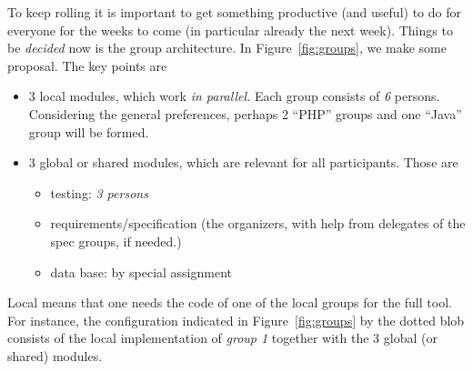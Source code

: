 \documentclass[11pt,handout]{handout}
\begin{document}
To keep rolling it is important to get something productive (and useful) to
do for everyone for the weeks to come (in particular already the next
week). Things to be \emph{decided} now is the group architecture. In
Figure~\ref{fig:groups}, we make some proposal. The key points are

\begin{itemize}
\item 3 local modules, which work \emph{in parallel.}  Each group consists
  of \emph{6} persons. Considering the general preferences, perhaps 2
  ``PHP'' groups and one ``Java'' group will be formed.
\item 3 global or shared modules, which are relevant for all participants.
  Those are
  \begin{itemize}
  \item testing: \emph{3 persons}
  \item requirements/specification (the organizers, with help from
    delegates of the spec groups, if needed.)
  \item data base: by special assignment
  \end{itemize}
\end{itemize}


Local means that one needs the code of one of the local groups for the full
tool. For instance, the configuration indicated in Figure~\ref{fig:groups}
by the dotted blob consists of the local implementation of \emph{group 1}
together with the 3 global (or shared) modules.

\medskip
\end{document}

